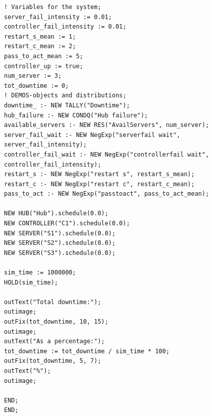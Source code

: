 \documentclass[11pt]{article}
\begin{document}
\begin{lstlisting}
! Variables for the system;
server_fail_intensity := 0.01;
controller_fail_intensity := 0.01;
restart_s_mean := 1;
restart_c_mean := 2;
pass_to_act_mean := 5;
controller_up := true;
num_server := 3;
tot_downtime := 0;
! DEMOS-objects and distributions;
downtime_ :- NEW TALLY("Downtime");
hub_failure :- NEW CONDQ("Hub failure");
available_servers :- NEW RES("AvailServers", num_server);
server_fail_wait :- NEW NegExp("serverfail wait", server_fail_intensity);
controller_fail_wait :- NEW NegExp("controllerfail wait", controller_fail_intensity);
restart_s :- NEW NegExp("restart s", restart_s_mean);
restart_c :- NEW NegExp("restart c", restart_c_mean);
pass_to_act :- NEW NegExp("passtoact", pass_to_act_mean);

NEW HUB("Hub").schedule(0.0);
NEW CONTROLLER("C1").schedule(0.0);
NEW SERVER("S1").schedule(0.0);
NEW SERVER("S2").schedule(0.0);
NEW SERVER("S3").schedule(0.0);

sim_time := 1000000;
HOLD(sim_time);

outText("Total downtime:");
outimage;
outFix(tot_downtime, 10, 15);
outimage;
outText("As a percentage:");
tot_downtime := tot_downtime / sim_time * 100;
outFix(tot_downtime, 5, 7);
outText("%");
outimage;

END;
END;

\end{lstlisting}
\end{document}
